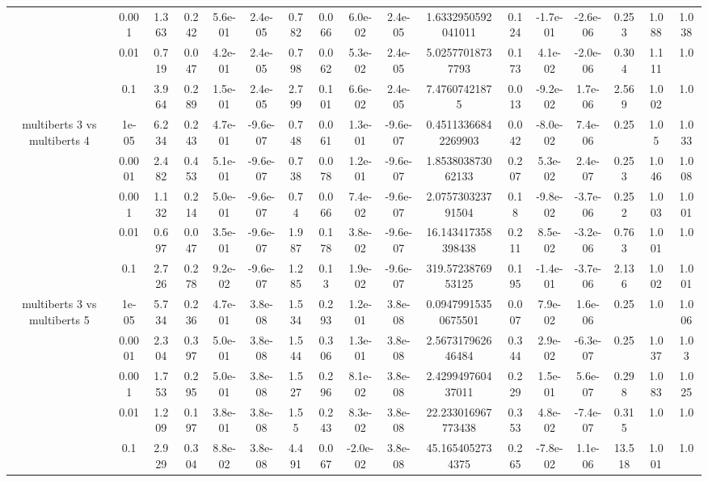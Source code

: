 \begin{tabular}{|c|c|c|c|c|c|c|c|c|c|c|c|c|c|c|c|c|}
 & 0.001 & 1.363 & 0.242 & 5.6e-01 & 2.4e-05 & 0.782 & 0.066 & 6.0e-02 & 2.4e-05 & 1.6332950592041011 & 0.124 & -1.7e-01 & -2.6e-06 & 0.253 & 1.088 & 1.038 \\
 & 0.01 & 0.719 & 0.047 & 4.2e-01 & 2.4e-05 & 0.798 & 0.062 & 5.3e-02 & 2.4e-05 & 5.02577018737793 & 0.173 & 4.1e-02 & -2.0e-06 & 0.304 & 1.111 & 1.0 \\
 & 0.1 & 3.964 & 0.289 & 1.5e-01 & 2.4e-05 & 2.799 & 0.101 & 6.6e-02 & 2.4e-05 & 7.47607421875 & 0.013 & -9.2e-02 & 1.7e-06 & 2.569 & 1.002 & 1.0 \\
\hline
\multirow{5}{*}{multiberts 3 vs multiberts 4} & 1e-05 & 6.234 & 0.243 & 4.7e-01 & -9.6e-07 & 0.748 & 0.061 & 1.3e-01 & -9.6e-07 & 0.45113366842269903 & 0.042 & -8.0e-02 & 7.4e-06 & 0.25 & 1.05 & 1.033 \\
 & 0.0001 & 2.482 & 0.453 & 5.1e-01 & -9.6e-07 & 0.738 & 0.078 & 1.2e-01 & -9.6e-07 & 1.853803873062133 & 0.207 & 5.3e-02 & 2.4e-07 & 0.253 & 1.046 & 1.008 \\
 & 0.001 & 1.132 & 0.214 & 5.0e-01 & -9.6e-07 & 0.74 & 0.066 & 7.4e-02 & -9.6e-07 & 2.075730323791504 & 0.18 & -9.8e-02 & -3.7e-06 & 0.252 & 1.003 & 1.001 \\
 & 0.01 & 0.697 & 0.047 & 3.5e-01 & -9.6e-07 & 1.987 & 0.178 & 3.8e-02 & -9.6e-07 & 16.143417358398438 & 0.211 & 8.5e-02 & -3.2e-06 & 0.763 & 1.001 & 1.0 \\
 & 0.1 & 2.726 & 0.278 & 9.2e-02 & -9.6e-07 & 1.285 & 0.13 & 1.9e-02 & -9.6e-07 & 319.5723876953125 & 0.195 & -1.4e-01 & -3.7e-06 & 2.136 & 1.002 & 1.001 \\
\hline
\multirow{5}{*}{multiberts 3 vs multiberts 5} & 1e-05 & 5.734 & 0.236 & 4.7e-01 & 3.8e-08 & 1.534 & 0.293 & 1.2e-01 & 3.8e-08 & 0.09479915350675501 & 0.007 & 7.9e-02 & 1.6e-06 & 0.25 & 1.0 & 1.006 \\
 & 0.0001 & 2.304 & 0.397 & 5.0e-01 & 3.8e-08 & 1.544 & 0.306 & 1.3e-01 & 3.8e-08 & 2.567317962646484 & 0.344 & 2.9e-02 & -6.3e-07 & 0.25 & 1.037 & 1.03 \\
 & 0.001 & 1.753 & 0.295 & 5.0e-01 & 3.8e-08 & 1.527 & 0.296 & 8.1e-02 & 3.8e-08 & 2.429949760437011 & 0.229 & 1.5e-01 & 5.6e-07 & 0.298 & 1.083 & 1.025 \\
 & 0.01 & 1.209 & 0.197 & 3.8e-01 & 3.8e-08 & 1.55 & 0.243 & 8.3e-02 & 3.8e-08 & 22.233016967773438 & 0.353 & 4.8e-02 & -7.4e-07 & 0.315 & 1.0 & 1.0 \\
 & 0.1 & 2.929 & 0.304 & 8.8e-02 & 3.8e-08 & 4.491 & 0.067 & -2.0e-02 & 3.8e-08 & 45.1654052734375 & 0.265 & -7.8e-02 & 1.1e-06 & 13.518 & 1.001 & 1.0 \\

\end{tabular}

